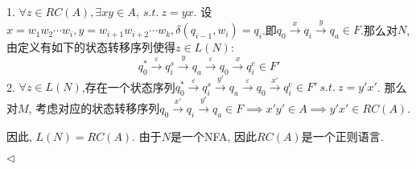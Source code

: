\documentclass[11pt]{article}
\newenvironment{answer}[1][Answer]{\begin{trivlist}
\item[\hskip \labelsep{\bfseries\itshape#1.}\hskip \labelsep]}{\hfill$\lhd$\end{trivlist}}
\begin{document}
\begin{answer}
\begin{enumerate}[label = (\alph*)]
        1. $\forall z \in RC(A), \exists xy \in A, ~s.t.~ z = yx$. 设$x = w_1 w_2 \cdots w_i, y = w_{i+1} w_{i+2} \cdots w_k, \delta(q_{i-1}, w_i) = q_i$.即$q_0 \overset{x}{\longrightarrow} q_i \overset{y}{\longrightarrow} q_{a} \in F$.那么对$N$, 由定义有如下的状态转移序列使得$z \in L(N)$:
        \[
          q_0^* \overset{\varepsilon}{\longrightarrow} q_i^s \overset{y}{\longrightarrow} q_a \overset{\varepsilon}{\longrightarrow} q_0 \overset{x}{\longrightarrow} q_i^e \in F'
        \]
        2. $\forall z \in L(N)$,存在一个状态序列$q_0^* \overset{\varepsilon}{\longrightarrow} q_i^s \overset{y'}{\longrightarrow} q_a \overset{\varepsilon}{\longrightarrow} q_0 \overset{x'}{\longrightarrow} q_i^e \in F' ~s.t.~ z = y'x'$. 那么对$M$, 考虑对应的状态转移序列$q_0 \overset{x'}{\longrightarrow} q_i \overset{y'}{\longrightarrow} q_{a} \in F \implies x'y' \in A \implies y'x' \in RC(A)$.
        
        因此, $L(N) = RC(A)$. 由于$N$是一个NFA, 因此$RC(A)$是一个正则语言.
    \end{enumerate}
\end{answer}
\end{document}
